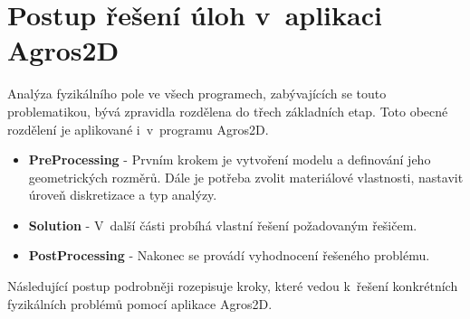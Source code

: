 
\chapter{Postup řešení úloh v~aplikaci Agros2D}  \label{kap:tutorial}
Analýza fyzikálního pole ve všech programech, zabývajících se touto problematikou, bývá zpravidla rozdělena do třech základních etap. Toto obecné rozdělení je aplikované i~v~programu Agros2D.
\begin{itemize}
\item {\bf PreProcessing} - Prvním krokem je vytvoření modelu a definování jeho geometrických rozměrů. Dále je potřeba zvolit materiálové vlastnosti, nastavit úroveň diskretizace a typ analýzy.
\item {\bf Solution} - V~další části probíhá vlastní řešení požadovaným řešičem.
\item {\bf PostProcessing} - Nakonec se provádí vyhodnocení řešeného problému.
\end{itemize}
Následující postup podrobněji rozepisuje kroky, které vedou k~řešení konkrétních fyzikálních problémů pomocí aplikace Agros2D.
